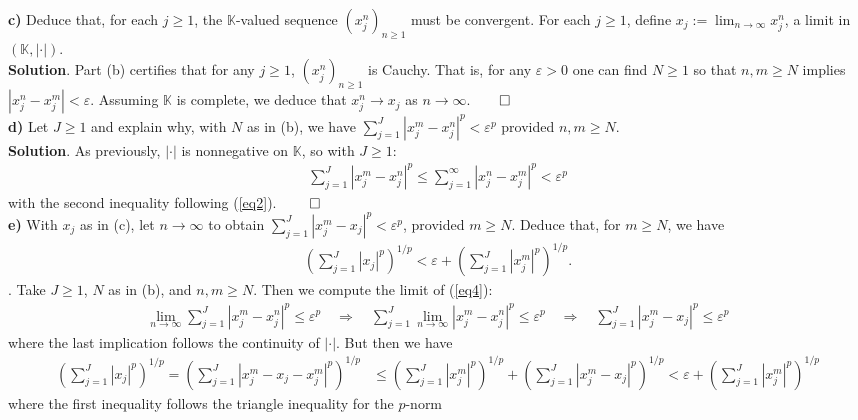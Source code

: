 \documentclass[10pt]{article}
\newcommand{\mbb}[1]{\mathbb{#1}}
\newcommand{\1}[1]{\mathbbm{1}_{#1}}
\begin{document}
    {\bf c)} Deduce that, for each $j\geq 1$, the $\mbb{K}$-valued sequence
    $(x^n_j)_{n\geq 1}$ must be convergent. For each $j\geq 1$, define
    $x_j:=\lim_{n\rightarrow\infty}x^n_j$, a limit in
    $(\mbb{K},|\cdot|)$.\\[5pt]
    {\bf Solution}. Part (b) certifies that for any $j\geq 1$, $(x^n_j)_{n\geq
    1}$ is Cauchy. That is, for any $\varepsilon>0$ one can find $N\geq 1$ so
    that $n,m\geq N$ implies $|x^n_j-x^m_j|<\varepsilon$. Assuming $\mbb{K}$ is
    complete, we deduce that $x^n_j\rightarrow x_j$ as
    $n\rightarrow\infty$.\hfill{$\qed$}\\[5pt]
    {\bf d)} Let $J\geq 1$ and explain why, with $N$ as in (b), we have
    $\sum_{j=1}^J|x^m_j-x^n_j|^p<\varepsilon^p$ provided $n,m\geq N$.\\[5pt]
    {\bf Solution}. As previously, $|\cdot|$ is nonnegative on $\mbb{K}$, so
    with $J\geq 1$:
    \begin{align}
        \sum_{j=1}^J|x^m_j-x^n_j|^p\leq\sum_{j=1}^\infty|x^n_j-x^m_j|^p<\varepsilon^p\label{eq4}
    \end{align}
    with the second inequality following (\ref{eq2}). \hfill{$\qed$}\\[5pt]
    {\bf e)} With $x_j$ as in (c), let $n\rightarrow\infty$ to obtain
    $\sum_{j=1}^J|x^m_j-x_j|^p<\varepsilon^p$, provided $m\geq N$. Deduce that,
    for $m\geq N$, we have
    \begin{align}
        \left(\sum_{j=1}^J|x_j|^p\right)^{1/p}<\varepsilon+\left(\sum_{j=1}^J|x^m_j|^p\right)^{1/p}.\label{eq3}
    \end{align}
    . Take $J\geq 1$, $N$ as in (b), and $n,m\geq N$.
    Then we compute the limit of (\ref{eq4}):
    \begin{align*}
        \lim_{n\rightarrow\infty}\sum_{j=1}^J|x^m_j-x^n_j|^p\leq\varepsilon^p\quad\Rightarrow\quad\sum_{j=1}^J\lim_{n\rightarrow\infty}|x^m_j-x^n_j|^p\leq\varepsilon^p\quad\Rightarrow\quad\sum_{j=1}^J|x^m_j-x_j|^p\leq\varepsilon^p
    \end{align*}
    where the last implication follows the continuity of $|\cdot|$. But then we
    have
    \begin{align*}
        \left(\sum_{j=1}^J|x_j|^p\right)^{1/p}=\left(\sum_{j=1}^J|x^m_j-x_j-x^m_j|^p\right)^{1/p}&\leq\left(\sum_{j=1}^J|x^m_j|^p\right)^{1/p}+\left(\sum_{j=1}^J|x^m_j-x_j|^p\right)^{1/p}<\varepsilon+\left(\sum_{j=1}^J|x^m_j|^p\right)^{1/p}
    \end{align*}
    where the first inequality follows the triangle inequality for the $p$-norm
\end{document}
